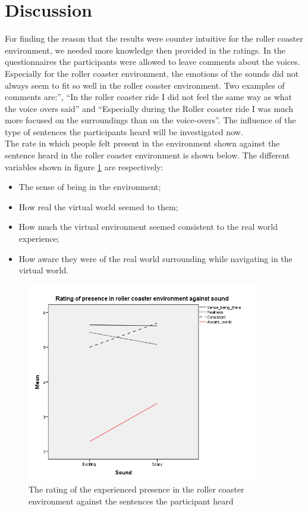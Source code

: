 \documentclass[Results.tex]{subfiles}
\begin{document}
\section{Discussion}
For finding the reason that the results were counter intuitive for the roller coaster environment, we needed more knowledge then provided in the ratings. In the questionnaires the participants were allowed to leave comments about the voices. Especially for the roller coaster environment, the emotions of the sounds did not always seem to fit so well in the roller coaster environment. Two examples of comments are:”, “In the roller coaster ride I did not feel the same way as what the voice overs said” and “Especially during the Roller coaster ride I was much more focused on the surroundings than on the voice-overs”. The influence of the type of sentences the participants heard will be investigated now. \\

The rate in which people felt present in the environment shown against the sentence heard in the roller coaster environment is shown below. The different variables shown in figure \ref{fig:Ratings_presence_RC} are respectively: 

\begin{itemize}
	\item The sense of being in the environment;
  \item How real the virtual world seemed to them;
  \item How much the virtual environment seemed consistent to the real world experience;
  \item How aware they were of the real world surrounding while navigating in the virtual world.
\end{itemize}

\begin{figure}[H]
	\centering
		\includegraphics[width=0.90\textwidth]{Section_1/Figures/Ratings_presence_RC.png}
	\caption{The rating of the experienced presence in the roller coaster environment against the sentences the participant heard}
	\label{fig:Ratings_presence_RC}
\end{figure}
\end{document}
